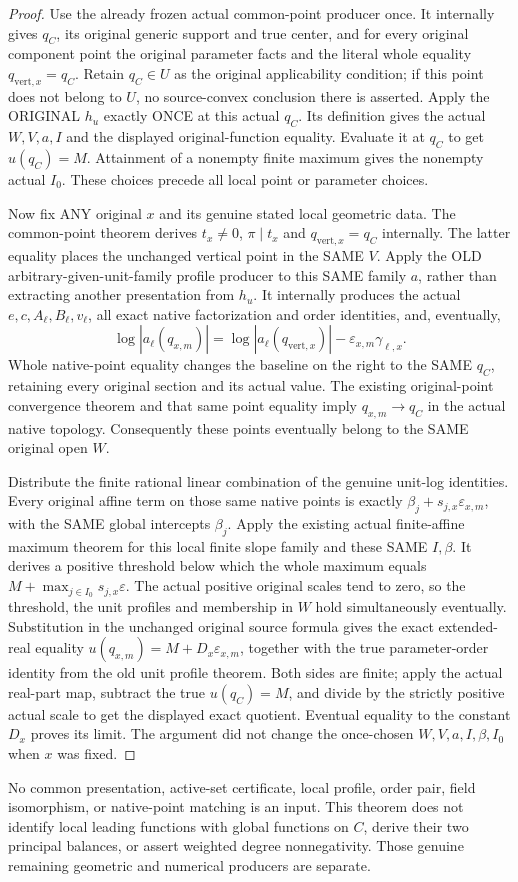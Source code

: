 \begin{proof}
Use the already frozen actual common-point producer once. It internally
gives $q_C$, its original generic support and true center, and for every
original component point the original parameter facts and the literal
whole equality $q_{\mathrm{vert},x}=q_C$.
Retain $q_C\in U$ as the original applicability condition; if this point
does not belong to $U$, no source-convex conclusion there is asserted.
Apply the ORIGINAL $h_u$ exactly ONCE at this actual $q_C$. Its definition
gives the actual $W,V,a,I$ and the displayed original-function equality.
Evaluate it at $q_C$ to get $u(q_C)=M$. Attainment of a nonempty finite
maximum gives the nonempty actual $I_0$. These choices precede all local
point or parameter choices.

Now fix ANY original $x$ and its genuine stated local geometric data.
The common-point theorem derives $t_x\ne0$, $\pi\mid t_x$ and
$q_{\mathrm{vert},x}=q_C$ internally. The latter equality places the
unchanged vertical point in the SAME $V$.
Apply the OLD arbitrary-given-unit-family profile producer to this SAME
family $a$, rather than extracting another presentation from $h_u$.
It internally produces the actual $e,c,A_\ell,B_\ell,v_\ell$, all exact
native factorization and order identities, and, eventually,
\[
 \log|a_\ell(q_{x,m})|
 =\log|a_\ell(q_{\mathrm{vert},x})|
   -\varepsilon_{x,m}\gamma_{\ell,x}.
\]
Whole native-point equality changes the baseline on the right to the
SAME $q_C$, retaining every original section and its actual value.
The existing original-point convergence theorem and that same point
equality imply $q_{x,m}\to q_C$ in the actual native topology. Consequently
these points eventually belong to the SAME original open $W$.

Distribute the finite rational linear combination of the genuine unit-log
identities. Every original affine term on those same native points is
exactly $\beta_j+s_{j,x}\varepsilon_{x,m}$, with the SAME global intercepts
$\beta_j$. Apply the existing actual finite-affine maximum theorem for this
local finite slope family and these SAME $I,\beta$. It derives a positive
threshold below which the whole maximum equals
$M+\max_{j\in I_0}s_{j,x}\varepsilon$.
The actual positive original scales tend to zero, so the threshold,
the unit profiles and membership in $W$ hold simultaneously eventually.
Substitution in the unchanged original source formula gives the exact
extended-real equality $u(q_{x,m})=M+D_x\varepsilon_{x,m}$, together with
the true parameter-order identity from the old unit profile theorem.
Both sides are finite; apply the actual real-part map, subtract the true
$u(q_C)=M$, and divide by the strictly positive actual scale to get the
displayed exact quotient. Eventual equality to the constant $D_x$ proves
its limit. The argument did not change the once-chosen $W,V,a,I,\beta,I_0$
when $x$ was fixed.
\end{proof}

No common presentation, active-set certificate, local profile, order pair,
field isomorphism, or native-point matching is an input. This theorem does
not identify local leading functions with global functions on $C$, derive
their two principal balances, or assert weighted degree nonnegativity.
Those genuine remaining geometric and numerical producers are separate.
